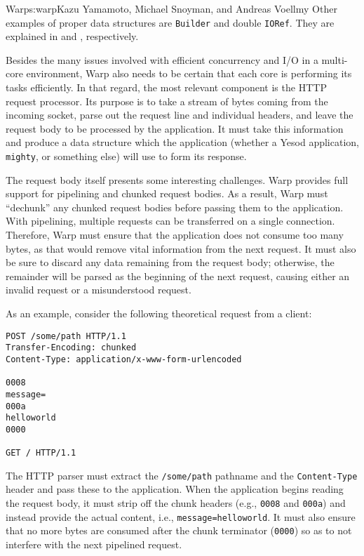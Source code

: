 \begin{aosachapter}{Warp}{s:warp}{Kazu Yamamoto, Michael Snoyman, and Andreas Voellmy}
Other examples of proper data structures are \texttt{Builder} and double
\texttt{IORef}. They are explained in  and
, respectively.


Besides the many issues involved with efficient concurrency and I/O in a
multi-core environment, Warp also needs to be certain that each core is
performing its tasks efficiently. In that regard, the most relevant
component is the HTTP request processor. Its purpose is to take a stream
of bytes coming from the incoming socket, parse out the request line and
individual headers, and leave the request body to be processed by the
application. It must take this information and produce a data structure
which the application (whether a Yesod application, \texttt{mighty}, or
something else) will use to form its response.

The request body itself presents some interesting challenges. Warp
provides full support for pipelining and chunked request bodies. As a
result, Warp must ``dechunk'' any chunked request bodies before passing
them to the application. With pipelining, multiple requests can be
transferred on a single connection. Therefore, Warp must ensure that the
application does not consume too many bytes, as that would remove vital
information from the next request. It must also be sure to discard any
data remaining from the request body; otherwise, the remainder will be
parsed as the beginning of the next request, causing either an invalid
request or a misunderstood request.

As an example, consider the following theoretical request from a client:

\begin{verbatim}
POST /some/path HTTP/1.1
Transfer-Encoding: chunked
Content-Type: application/x-www-form-urlencoded

0008
message=
000a
helloworld
0000

GET / HTTP/1.1
\end{verbatim}

The HTTP parser must extract the \texttt{/some/path} pathname and the
\texttt{Content-Type} header and pass these to the application. When the
application begins reading the request body, it must strip off the chunk
headers (e.g., \texttt{0008} and \texttt{000a}) and instead provide the
actual content, i.e., \texttt{message=helloworld}. It must also ensure
that no more bytes are consumed after the chunk terminator
(\texttt{0000}) so as to not interfere with the next pipelined request.


\end{aosachapter}
